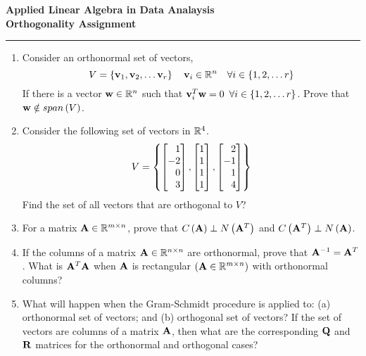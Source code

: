 \documentclass[12pt]{article}
\def\mf{\ensuremath\mathbf}
\def\mb{\ensuremath\mathbb}
\def\lp{\ensuremath\left(}
\def\rp{\ensuremath\right)}
\def\bmx{\ensuremath\begin{bmatrix*}[r]}
\def\emx{\ensuremath\end{bmatrix*}}
\begin{document}
\begin{center}
\begin{Large}
\textbf{Applied Linear Algebra in Data Analaysis}\\
\vspace{0.1cm}
\textbf{Orthogonality Assignment}
\end{Large}
\end{center}
\hrule
\vspace{0.2cm}

\begin{enumerate}
  \item Consider an orthonormal set of vectors,
  \[ V = \left\{ \mf{v}_1, \mf{v}_2, \ldots \mf{v}_r\right\} \quad \mf{v}_i \in \mb{R}^n \quad \forall i \in \left\{1, 2, \ldots r\right\}\]
  If there is a vector $\mf{w} \in \mb{R}^n$ such that $\mf{v}_i^T\mf{w} = 0\,\,\,\forall i \in \left\{1, 2, \ldots r\right\}$. Prove that $\mf{w} \notin span\left(V\right)$.
  
  \item Consider the following set of vectors in $\mb{R}^4$.
  \[ V = \left\{
  \bmx
  1\\-2\\0\\3
  \emx,
  \bmx
  1\\1\\1\\1
  \emx,
  \bmx
  2\\-1\\1\\4
  \emx
  \right\} \]
  Find the set of all vectors that are orthogonal to $V$?

  \item For a matrix $\mf{A} \in \mb{R}^{m \times n}$, prove that $C\lp\mf{A}\rp \perp N\lp\mf{A}^T\rp$ and $C\lp\mf{A}^T\rp \perp N\lp\mf{A}\rp$.

  \item If the columns of a matrix $\mf{A} \in \mb{R}^{n \times n}$ are orthonormal, prove that $\mf{A}^{-1} = \mf{A}^T$. What is $\mf{A}^T\mf{A}$ when $\mf{A}$ is rectangular $\left(\mf{A} \in \mb{R}^{m \times n}\right)$ with orthonormal columns?

  \item What will happen when the Gram-Schmidt procedure is applied to: (a) orthonormal set of vectors; and (b) orthogonal set of vectors? If the set of vectors are columns of a matrix $\mf{A}$, then what are the corresponding $\mf{Q}$ and $\mf{R}$ matrices for the orthonormal and orthogonal cases?


\end{enumerate}
\end{document}
